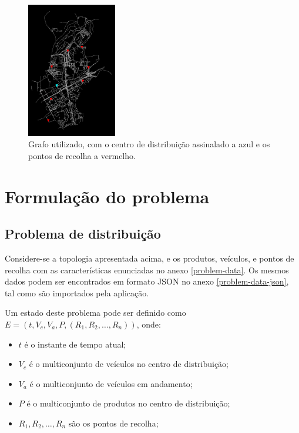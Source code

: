 \documentclass[12pt, a4paper]{article}
\begin{document}
\begin{figure}[H]
    \centering
    \includegraphics[width=0.35\textwidth]{res/PontosImportantes.png}
    \caption{
        Grafo utilizado, com o centro de distribuição assinalado a azul e os pontos de recolha a
        vermelho.
    }
\end{figure}

\section{Formulação do problema}

\subsection{Problema de distribuição}

Considere-se a topologia apresentada acima, e os produtos, veículos, e pontos de recolha com as
características enunciadas no anexo \ref{problem-data}. Os mesmos dados podem ser encontrados em
formato JSON no anexo \ref{problem-data-json}, tal como são importados pela aplicação.

Um estado deste problema pode ser definido como $E = (t, V_c, V_a, P, (R_1, R_2, \ldots, R_n))$,
onde:

\begin{itemize}
    \item $t$ é o instante de tempo atual;
    \item $V_c$ é o multiconjunto de veículos no centro de distribuição;
    \item $V_a$ é o multiconjunto de veículos em andamento;
    \item $P$ é o multiconjunto de produtos no centro de distribuição;
    \item $R_1, R_2, \ldots, R_n$ são os pontos de recolha;
\end{itemize}
\end{document}
